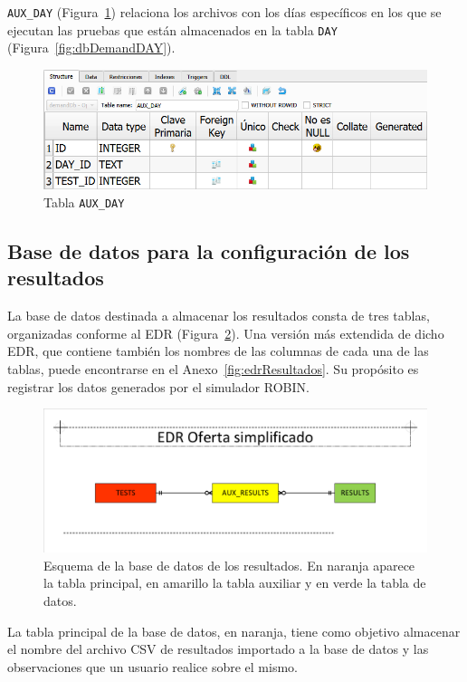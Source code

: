 \texttt{AUX\_DAY} (Figura~\ref{fig:dbDemandAUX_DAY}) relaciona los archivos con los días específicos en los que se ejecutan las pruebas que están almacenados en la tabla \texttt{DAY} (Figura~\ref{fig:dbDemandDAY}). 

\begin{figure}[H]
\centering
\includegraphics[width=.9\textwidth]{fig/Tablas base de datos/Demanda/AUX_DAY.png}
\caption{Tabla \texttt{AUX\_DAY}}
\label{fig:dbDemandAUX_DAY}
\end{figure}

\subsection{Base de datos para la configuración de los resultados}
\label{subsec:dBResults}
 La base de datos destinada a almacenar los resultados consta de tres tablas, organizadas conforme al \acrshort{EDR} (Figura~\ref{fig:edrResultadosSimplificado}). Una versión más extendida de dicho \acrshort{EDR}, que contiene también los nombres de las columnas de cada una de las tablas, puede encontrarse en el Anexo~\ref{fig:edrResultados}. Su propósito es registrar los datos generados por el simulador \acrshort{ROBIN}.


\begin{figure}[H]
\centering
\includegraphics[width=.9\textwidth]{fig/Bases de datos/EDR resultados simplificado.pdf}
\caption{Esquema de la base de datos de los resultados. En naranja aparece la tabla principal, en amarillo la tabla auxiliar y en verde la tabla de datos.}
\label{fig:edrResultadosSimplificado}
\end{figure}

La tabla principal de la base de datos, en naranja, tiene como objetivo almacenar el nombre del archivo \acrshort{CSV} de resultados importado a la base de datos y las observaciones que un usuario realice sobre el mismo.

